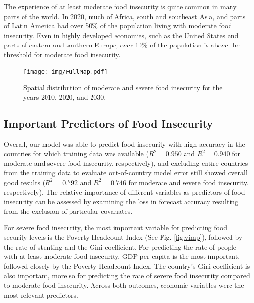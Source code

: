 \documentclass{article}
\begin{document}
The experience of at least moderate food insecurity is quite common in many parts of the world.  In 2020, much of Africa, south and southeast Asia, and parts of Latin America had over 50\% of the population living with moderate food insecurity.  Even in highly developed economies, such as the United States and parts of eastern and southern Europe, over 10\% of the population is above the threshold for moderate food insecurity.

\begin{landscape}
\begin{figure}[h]
  \centering
  \texttt{[image: img/FullMap.pdf]}
  \caption{Spatial distribution of moderate and severe food insecurity for the years 2010, 2020, and 2030.}
  \label{fig:map}
\end{figure}
\end{landscape}

\subsection{Important Predictors of Food Insecurity}
Overall, our model was able to predict food insecurity with high accuracy in the countries for which training data was available ($R^2 = 0.950$ and $R^2 = 0.940$ for moderate and severe food insecurity, respectively), and excluding entire countries from the training data to evaluate out-of-country model error still showed overall good results ($R^2 = 0.792$ and $R^2 = 0.746$ for moderate and severe food insecurity, respectively).  The relative importance of different variables as predictors of food insecurity can be assessed by examining the loss in forecast accuracy resulting from the exclusion of particular covariates.

For severe food insecurity, the most important variable for predicting food security levels is the Poverty Headcount Index (See Fig. \ref{fig:vimp}), followed by the rate of stunting and the Gini coefficient.  For predicting the rate of people with at least moderate food insecurity, GDP per capita is the most important, followed closely by the Poverty Headcount Index.  The country's Gini coefficient is also important, more so for predicting the rate of severe food insecurity compared to moderate food insecurity.  Across both outcomes, economic variables were the most relevant predictors.
\end{document}
